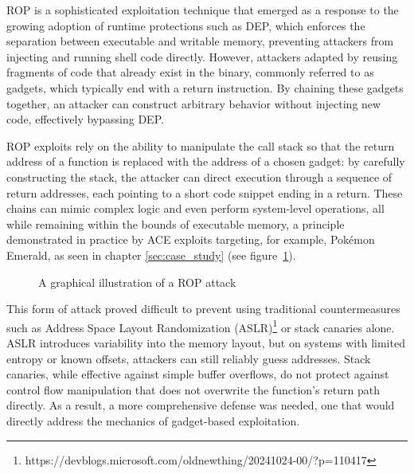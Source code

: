 \documentclass[a4paper]{usiinfbachelorproject}
\begin{document}

ROP is a sophisticated exploitation technique that emerged as a response to the growing adoption of runtime protections such as DEP, which enforces the separation between executable and writable memory, preventing attackers from injecting and running shell code directly. However, attackers adapted by reusing fragments of code that already exist in the binary, commonly referred to as gadgets, which typically end with a return instruction. By chaining these gadgets together, an attacker can construct arbitrary behavior without injecting new code, effectively bypassing DEP.

ROP exploits rely on the ability to manipulate the call stack so that the return address of a function is replaced with the address of a chosen gadget: by carefully constructing the stack, the attacker can direct execution through a sequence of return addresses, each pointing to a short code snippet ending in a return. These chains can mimic complex logic and even perform system-level operations, all while remaining within the bounds of executable memory, a principle demonstrated in practice by ACE exploits targeting, for example, Pokémon Emerald, as seen in chapter \ref{sec:case_study} (see figure~\ref{fig:rop}).

\begin{figure}[h!]
	\caption{A graphical illustration of a ROP attack\label{fig:rop}}
\end{figure}

This form of attack proved difficult to prevent using traditional countermeasures such as Address Space Layout Randomization (ASLR)\footnote{https://devblogs.microsoft.com/oldnewthing/20241024-00/?p=110417} or stack canaries alone. ASLR introduces variability into the memory layout, but on systems with limited entropy or known offsets, attackers can still reliably guess addresses. Stack canaries, while effective against simple buffer overflows, do not protect against control flow manipulation that does not overwrite the function's return path directly. As a result, a more comprehensive defense was needed, one that would directly address the mechanics of gadget-based exploitation.
\end{document}

